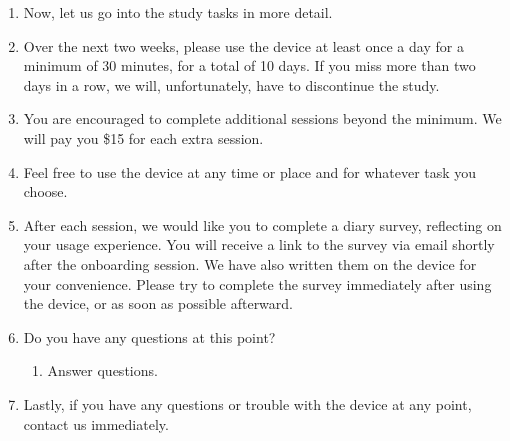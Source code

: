 \begin{enumerate}[label=(\arabic*)]
\item Now, let us go into the study tasks in more detail. 

\item Over the next two weeks, please use the device at least once a day for a minimum of 30 minutes, for a total of 10 days. If you miss more than two days in a row, we will, unfortunately, have to discontinue the study.

\item You are encouraged to complete additional sessions beyond the minimum. We will pay you \$15 for each extra session.

\item Feel free to use the device at any time or place and for whatever task you choose.

\item After each session, we would like you to complete a diary survey, reflecting on your usage experience. 
You will receive a link to the survey via email shortly after the onboarding session. 
We have also written them on the device for your convenience. Please try to complete the survey immediately after using the device, or as soon as possible afterward.

\item Do you have any questions at this point?
\begin{enumerate}
\item Answer questions.
\end{enumerate}

\item Lastly, if you have any questions or trouble with the device at any point, contact us immediately. 

\end{enumerate}

